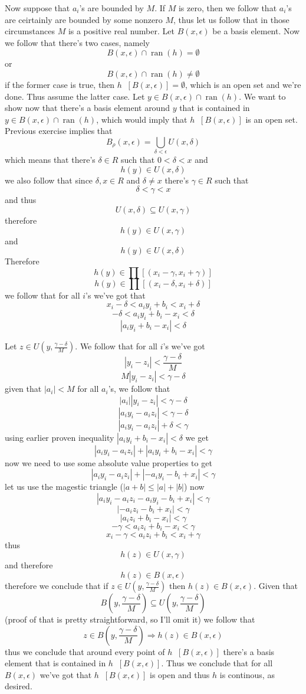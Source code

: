 \documentclass[11pt,oneside,titlepage]{book}
\DeclareMathOperator \inv {^{-1}}
\DeclareMathOperator \ra {\Rightarrow}
\DeclareMathOperator \ran {ran}
\begin{document}
Now suppose that $a_i$'s are bounded by $M$. If $M$ is zero, then we follow that
$a_i$'s are ceirtainly are bounded by some nonzero $M$, thus let us follow that in those
circumstances $M$ is a positive real number. Let $B(x, \epsilon)$ be a basis element.
Now we follow that there's two cases, namely
$$B(x, \epsilon) \cap \ran(h) = \emptyset $$
or
$$B(x, \epsilon) \cap \ran(h) \neq \emptyset $$
if the former case is true, then $h\inv[B(x, \epsilon)] = \emptyset$, which is an open set
and we're done. Thus assume the latter case. Let $y \in B(x, \epsilon) \cap \ran(h)$.
We want to show now that there's a basis element around $y$ that is contained in
$y \in B(x, \epsilon) \cap \ran(h)$, which would imply that $h\inv[B(x, \epsilon)]$ is an open
set. Previous exercise implies that 
$$B_\rho(x, \epsilon) = \bigcup_{\delta < \epsilon}{U(x, \delta)}$$
which means that there's $\delta \in R$ such that $0 < \delta < x$ and
$$h(y) \in U(x, \delta)$$
we also follow that since $\delta, x \in R$ and $\delta \neq x$ there's $\gamma \in R$ such that
$$\delta < \gamma < x$$
and thus
$$U(x, \delta) \subseteq U(x, \gamma)$$
therefore
$$h(y) \in U(x, \gamma)$$
and
$$h(y) \in U(x, \delta)$$
Therefore
$$h(y) \in \prod[(x_i - \gamma, x_i + \gamma)]$$
$$h(y) \in \prod[(x_i - \delta, x_i + \delta)]$$
we follow that for all $i$'s we've got that
$$x_i - \delta < a_i y_i + b_i < x_i + \delta$$
$$- \delta < a_i y_i + b_i - x_i <  \delta$$
$$|a_i y_i + b_i - x_i| <  \delta$$

Let $z \in U(y, \frac{\gamma - \delta}{M})$. We follow that for all $i$'s we've got
$$|y_i - z_i| < \frac{\gamma - \delta}{M}$$
$$M|y_i - z_i| < \gamma - \delta$$
given that $|a_i| < M$ for all $a_i$'s, we follow that 
$$|a_i||y_i - z_i| < \gamma - \delta$$
$$|a_iy_i - a_iz_i| < \gamma - \delta$$
$$|a_iy_i - a_iz_i| + \delta < \gamma$$
using earlier proven inequality $|a_i y_i + b_i - x_i| <  \delta$ we get
$$|a_iy_i - a_iz_i| + |a_i y_i + b_i - x_i| < \gamma$$
now we need to use some absolute value properties to get 
$$|a_iy_i - a_iz_i| + |- a_i y_i - b_i + x_i| < \gamma$$
let us use the magestic triangle ($|a + b| \leq |a| + |b|$) now
$$|a_iy_i - a_iz_i - a_i y_i - b_i + x_i| < \gamma$$
$$| - a_iz_i  - b_i + x_i| < \gamma$$
$$|a_iz_i  + b_i - x_i| < \gamma$$
$$-\gamma < a_iz_i  + b_i - x_i < \gamma$$
$$x_i - \gamma < a_iz_i  + b_i  < x_i + \gamma$$
thus
$$h(z) \in U(x, \gamma)$$
and therefore
$$h(z) \in B(x, \epsilon)$$
therefore we conclude that if $z \in U(y, \frac{\gamma - \delta}{M})$ then
$h(z) \in B(x, \epsilon)$. Given that
$$B(y, \frac{\gamma - \delta}{M}) \subseteq U(y, \frac{\gamma - \delta}{M})$$
(proof of that is pretty straightforward, so I'll omit it)
we follow that
$$z \in B(y, \frac{\gamma - \delta}{M}) \ra h(z) \in B(x, \epsilon)$$
thus we conclude that around every point of $h\inv[B(x, \epsilon)]$ there's a basis element
that is contained in $h\inv[B(x, \epsilon)]$. Thus we conclude that
for all $B(x, \epsilon)$ we've got that $h\inv[B(x, \epsilon)]$ is open and thus
$h$ is continous, as desired.
\end{document}
